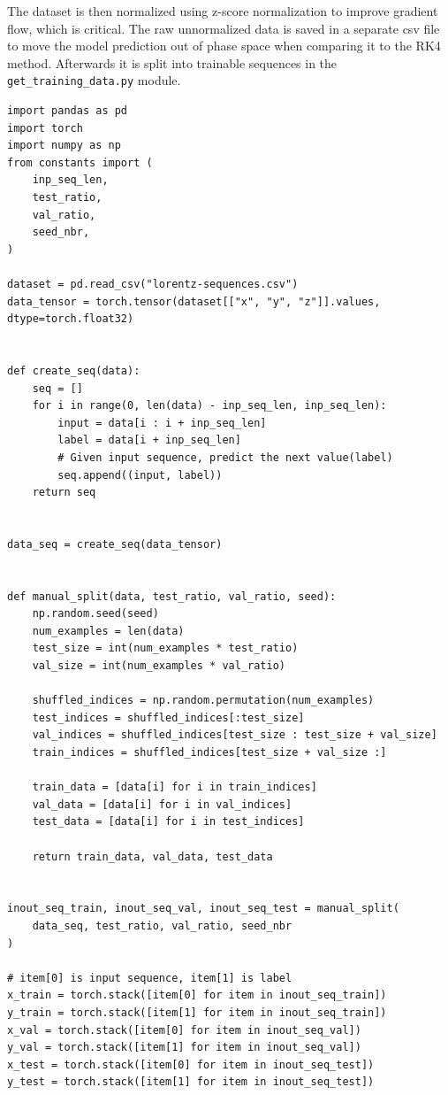 \documentclass[11pt]{article}
\begin{document}
The dataset is then normalized using z-score normalization to improve gradient flow, which is critical. The raw unnormalized data is saved in a separate csv file to move the model prediction out of phase space when comparing it to the RK4 method. Afterwards it is split into trainable sequences in the \texttt{get\_training\_data.py} module.
\begin{lstlisting}
import pandas as pd
import torch
import numpy as np
from constants import (
    inp_seq_len,
    test_ratio,
    val_ratio,
    seed_nbr,
)

dataset = pd.read_csv("lorentz-sequences.csv")
data_tensor = torch.tensor(dataset[["x", "y", "z"]].values, dtype=torch.float32)


def create_seq(data):
    seq = []
    for i in range(0, len(data) - inp_seq_len, inp_seq_len):
        input = data[i : i + inp_seq_len]
        label = data[i + inp_seq_len]
        # Given input sequence, predict the next value(label)
        seq.append((input, label))
    return seq


data_seq = create_seq(data_tensor)


def manual_split(data, test_ratio, val_ratio, seed):
    np.random.seed(seed)
    num_examples = len(data)
    test_size = int(num_examples * test_ratio)
    val_size = int(num_examples * val_ratio)

    shuffled_indices = np.random.permutation(num_examples)
    test_indices = shuffled_indices[:test_size]
    val_indices = shuffled_indices[test_size : test_size + val_size]
    train_indices = shuffled_indices[test_size + val_size :]

    train_data = [data[i] for i in train_indices]
    val_data = [data[i] for i in val_indices]
    test_data = [data[i] for i in test_indices]

    return train_data, val_data, test_data


inout_seq_train, inout_seq_val, inout_seq_test = manual_split(
    data_seq, test_ratio, val_ratio, seed_nbr
)

# item[0] is input sequence, item[1] is label
x_train = torch.stack([item[0] for item in inout_seq_train])
y_train = torch.stack([item[1] for item in inout_seq_train])
x_val = torch.stack([item[0] for item in inout_seq_val])
y_val = torch.stack([item[1] for item in inout_seq_val])
x_test = torch.stack([item[0] for item in inout_seq_test])
y_test = torch.stack([item[1] for item in inout_seq_test])
\end{lstlisting}
\end{document}
